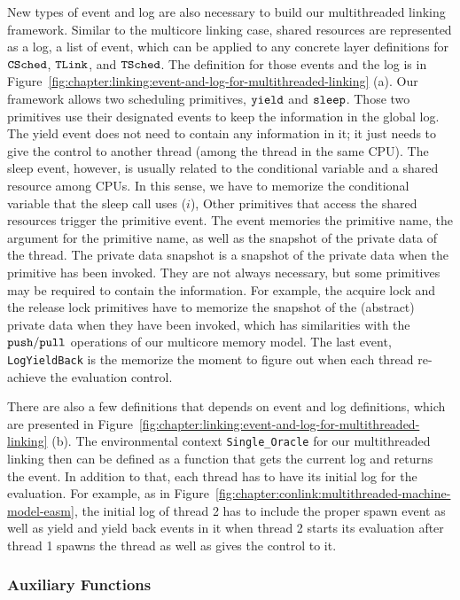 New types of event and log are also necessary to build our multithreaded linking framework. 
Similar to the multicore linking case, 
shared resources are represented as a log,  a list of event,
which can be applied to any concrete layer definitions for ${{\mathrm{\texttt{CSched}}}}$, ${{\mathrm{\texttt{TLink}}}}$, and ${{\mathrm{\texttt{TSched}}}}$.
The definition for those events and the log is in Figure~\ref{fig:chapter:linking:event-and-log-for-multithreaded-linking} (a).
Our framework allows two scheduling primitives, 
${\mathrm{\texttt{yield}}}$ and ${\mathrm{\texttt{sleep}}}$. 
Those two primitives use their designated events to keep the information in the global log. 
The yield event does not need to contain any information in it; it just needs to give the control
to another thread (among the thread in the same CPU). 
The sleep event, however, is usually related to the conditional variable and a shared resource among CPUs.
In this sense, we have to memorize the conditional variable that the sleep call uses ($i$),
Other primitives that access the shared resources trigger the primitive event. 
The event memories the primitive name, the argument for the primitive name,
as well as the snapshot of the private data of the thread.
The private data snapshot is a snapshot of the private data when the primitive has been invoked. 
They are not always necessary, but some primitives may be required to contain the information.
For example, the acquire lock and the release lock primitives have to memorize the snapshot of the (abstract) private data when they have been invoked, which has similarities with the ${\mathrm{\texttt{push}}}/{\mathrm{\texttt{pull}}}$ operations of our multicore memory model. 
The last event, \lstinline$LogYieldBack$ is the memorize the moment to figure out when each thread re-achieve the evaluation control. 

There are also a few definitions that depends on event and log definitions, which are presented in Figure~\ref{fig:chapter:linking:event-and-log-for-multithreaded-linking} (b).
The environmental context \lstinline$Single_Oracle$  for our multithreaded linking
then can be defined as a function that gets the current log and returns the event. 
In addition to that, 
each thread has to have its initial log for the evaluation. 
For example, as in Figure~\ref{fig:chapter:conlink:multithreaded-machine-model-easm},
the initial log of thread 2 has to include the proper spawn event as well as yield and yield back events in it
when thread 2 starts its evaluation after thread 1 spawns the thread as well as gives the control to it.

\subsubsection{Auxiliary Functions}

